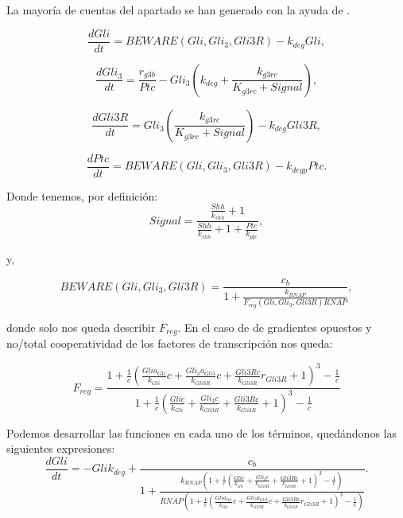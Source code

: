 La mayoría de cuentas del apartado se han generado con la ayuda de \cite{sympy}.

\begin{equation}
\frac{dGli}{dt} = BEWARE(Gli, Gli_3, Gli3R)-k_{deg}Gli,
\label{eq:1}
\end{equation}

\begin{equation}
\frac{dGli_3}{dt} = \frac{r_{g3b}}{Ptc}-Gli_3\left(k_{deg}+\frac{k_{g3rc}}{K_{g3rc}+Signal}\right),
\label{eq:2}
\end{equation}

\begin{equation}
\frac{dGli3R}{dt}= Gli_3\left(\frac{k_{g3rc}}{K_{g3rc}+Signal}\right)-k_{deg}Gli3R,
\label{eq:3}
\end{equation}

\begin{equation}
\frac{dPtc}{dt} = BEWARE(Gli, Gli_3, Gli3R)-k_{degp}Ptc.
\label{eq:4}
\end{equation}


Donde tenemos, por definición:
 \begin{equation}
Signal=\frac{\frac{Shh}{k_{shh}} + 1}{\frac{Shh}{k_{shh}} + 1 + \frac{Ptc}{k_{ptc}}},
\label{signal} \end{equation}

y,


\begin{equation}
BEWARE(Gli, Gli_3, Gli3R)=\frac{c_{b}}{1 + \frac{k_{RNAP}}{F_{reg}(Gli, Gli_3, Gli3R) RNAP}},
\end{equation}

donde solo nos queda describir $F_{reg}$. En el caso de de gradientes opuestos y no/total cooperatividad de los factores de transcripción nos queda:

\begin{equation}
F_{reg}=\frac{1 + \frac{1}{c} \left(\frac{Gli a_{Gli}}{k_{Gli}} c + \frac{Gli_{3} a_{Gli3}}{k_{Gli3R}} c + \frac{Gli3R c}{k_{Gli3R}} r_{Gli3R} + 1\right)^{3} - \frac{1}{c}}{1 + \frac{1}{c} \left(\frac{Gli c}{k_{Gli}} + \frac{Gli_{3} c}{k_{Gli3R}} + \frac{Gli3R c}{k_{Gli3R}} + 1\right)^{3} - \frac{1}{c}}
\end{equation}






Podemos desarrollar las funciones en cada uno de los términos, quedándonos las siguientes expresiones:
\begin{equation}
\frac{dGli}{dt}=- Gli k_{deg} + \frac{c_{b}}{1 + \frac{k_{RNAP} \left(1 + \frac{1}{c} \left(\frac{Gli c}{k_{Gli}} + \frac{Gli_{3} c}{k_{Gli3R}} + \frac{Gli3R c}{k_{Gli3R}} + 1\right)^{3} - \frac{1}{c}\right)}{RNAP \left(1 + \frac{1}{c} \left(\frac{Gli a_{Gli}}{k_{Gli}} c + \frac{Gli_{3} a_{Gli3}}{k_{Gli3R}} c + \frac{Gli3R c}{k_{Gli3R}} r_{Gli3R} + 1\right)^{3} - \frac{1}{c}\right)}}.
\end{equation}


